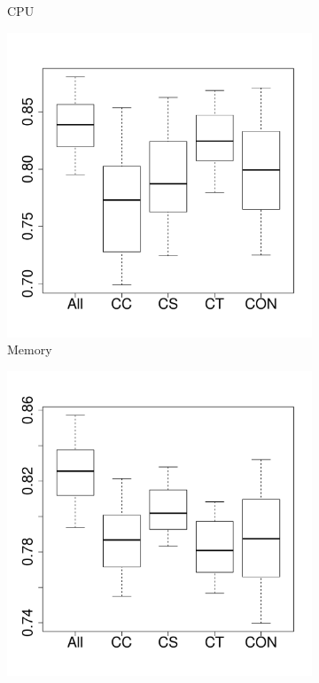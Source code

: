 \documentclass[10pt,journal,compsoc]{IEEEtran}
\begin{document}
\begin{figure}[t]
\begin{subfigure}{0.19\textwidth}
                \caption{CPU}
        \end{subfigure}%
        \begin{subfigure}{0.19\textwidth}
                \includegraphics[width=\linewidth]{Figures/mem-cassandraremove-importance.pdf}
                \caption{Memory}
        \end{subfigure}%
        \begin{subfigure}{0.19\textwidth}
                \includegraphics[width=\linewidth]{Figures/ioread-cassandraremove-importance.pdf}

\end{subfigure}
\end{figure}
\end{document}

